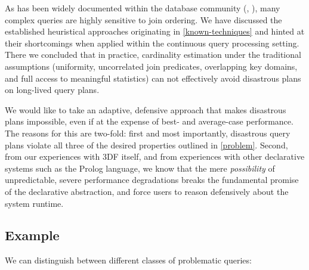 \documentclass[../catalog.tex]{subfiles}
\begin{document}
As has been widely documented within the database community
(\cite{leis2015good}, \cite{lohman2014query}), many complex queries
are highly sensitive to join ordering. We have discussed the
established heuristical approaches originating in
\autoref{known-techniques} and hinted at their shortcomings when
applied within the continuous query processing setting. There we
concluded that in practice, cardinality estimation under the
traditional assumptions (uniformity, uncorrelated join predicates,
overlapping key domains, and full access to meaningful statistics) can
not effectively avoid disastrous plans on long-lived query plans.

We would like to take an adaptive, defensive approach that makes
disastrous plans impossible, even if at the expense of best- and
average-case performance. The reasons for this are two-fold: first and
most importantly, disastrous query plans violate all three of the
desired properties outlined in \autoref{problem}. Second, from our
experiences with 3DF itself, and from experiences with other
declarative systems such as the Prolog language, we know that the mere
\emph{possibility} of unpredictable, severe performance degradations
breaks the fundamental promise of the declarative abstraction, and
force users to reason defensively about the system runtime.

\subsection{Example}

We can distinguish between different classes of problematic queries:
\end{document}
